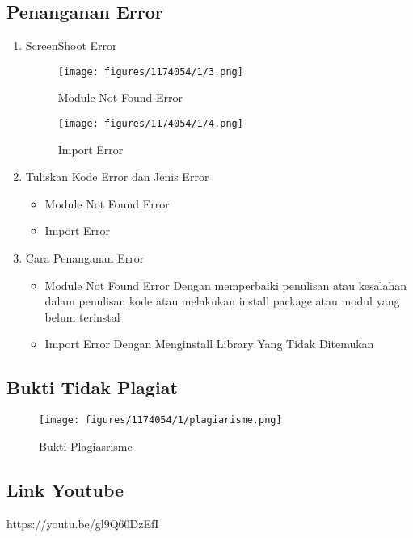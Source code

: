\subsection{Penanganan Error}
\begin{enumerate}
\item ScreenShoot Error
	\begin{figure}[H]
		\texttt{[image: figures/1174054/1/3.png]}
		\centering
		\caption{Module Not Found Error}
	\end{figure}
	\begin{figure}[H]
		\texttt{[image: figures/1174054/1/4.png]}
		\centering
		\caption{Import Error}
	\end{figure}

	\item Tuliskan Kode Error dan Jenis Error
	\begin{itemize}
		\item Module Not Found Error
		\item Import Error
	\end{itemize}
	\item Cara Penanganan Error
	\begin{itemize}
		\item Module Not Found Error
		\hfill\break
		Dengan memperbaiki penulisan atau kesalahan dalam penulisan kode atau melakukan install package atau modul yang belum terinstal
		\item Import Error
		\hfill\break
		Dengan Menginstall Library Yang Tidak Ditemukan
	\end{itemize}
\end{enumerate}


\subsection{Bukti Tidak Plagiat}
\begin{figure}[H]
	\texttt{[image: figures/1174054/1/plagiarisme.png]}
	\centering
	\caption{Bukti Plagiasrisme}
\end{figure}

\subsection{Link Youtube}
https://youtu.be/gl9Q60DzEfI
